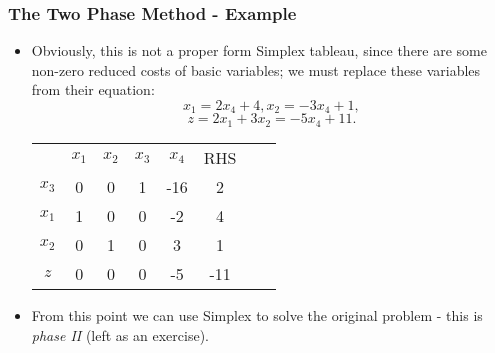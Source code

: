 \documentclass{beamer}
\theoremstyle{plain}
\newcommand{\git}[1]{\textcolor{grena}{\it #1}}
\begin{document}
\begin{frame}\frametitle{The Two Phase Method - Example}
\justifying

\begin{itemize}
\justifying

\item Obviously, this is not a proper form Simplex tableau, since there are some non-zero reduced costs of basic variables; we must replace these variables from their equation:
\[ x_1 = 2x_4 + 4, x_2 = -3x_4 + 1, \]
\[ z = 2x_1 + 3x_2 = -5x_4 + 11. \]
\begin{center}
\vspace{-0.3cm}
\begin{tabular}{c|cccc|ccc}	
& $ x_1 $ & $ x_2 $ & $ x_3 $ & $ x_4 $ & {\tiny RHS}  && \\
\cline{1-8}	
 $ x_3 $ & 0 & 0 & 1 & -16 &  2 & & \\	
 $ x_1 $ & 1 & 0 & 0 & -2 &  4 & & \\	
$ x_2 $ & 0 & 1 & 0 & 3 &  1 & & \\
\cline{1-8}	
$ z $ & 0 & 0 & 0 & -5 &  -11  & & \\
\end{tabular}
\end{center}

\item From this point we can use Simplex to solve the original problem - this is \git{phase II} (left as an exercise).

\end{itemize}

\end{frame}
\end{document}
